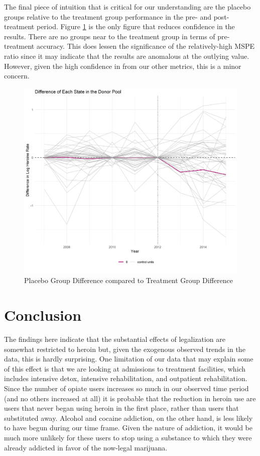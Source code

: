 \documentclass{article}
\begin{document}
The final piece of intuition that is critical for our understanding are the placebo groups relative to the treatment group performance in the pre- and post-treatment period. Figure \ref{fig:HerPlac} is the only figure that reduces confidence in the results. There are no groups near to the treatment group in terms of pre-treatment accuracy. This does lessen the significance of the relatively-high MSPE ratio since it may indicate that the results are anomalous at the outlying value. However, given the high confidence in from our other metrics, this is a minor concern.

\begin{figure}[H]
    \begin{center}
        \includegraphics[width=.85\textwidth]{Figure_Placebos_Heroin.png}
    \end{center}
    \caption{Placebo Group Difference compared to Treatment Group Difference}
    \label{fig:HerPlac}
\end{figure}

\section{Conclusion}

The findings here indicate that the substantial effects of legalization are somewhat restricted to heroin but, given the exogenous observed trends in the data, this is hardly surprising. One limitation of our data that may explain some of this effect is that we are looking at admissions to treatment facilities, which includes intensive detox, intensive rehabilitation, and outpatient rehabilitation. Since the number of opiate users increases so much in our observed time period (and no others increased at all) it is probable that the reduction in heroin use are users that never began using heroin in the first place, rather than users that substituted away. Alcohol and cocaine addiction, on the other hand, is less likely to have begun during our time frame. Given the nature of addiction, it would be much more unlikely for these users to stop using a substance to which they were already addicted in favor of the now-legal marijuana.
\end{document}
